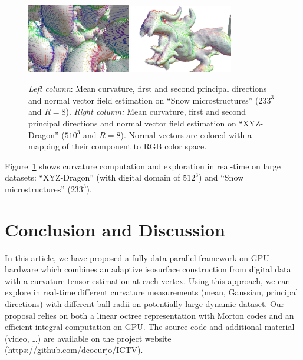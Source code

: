 \documentclass{llncs}
\begin{document}
\begin{figure}[h!]
\begin{center}
     {\includegraphics[width=0.4\textwidth]{figs/snow_r8_normales}}
     {\includegraphics[width=0.4\textwidth]{figs/dragon_r8_normales}}

   \end{center}
   \caption{\emph{Left column}: Mean curvature, first and second
     principal directions and normal vector field estimation on ``Snow microstructures'' ($233^3$ and $R=8$).
  \emph{Right column:} Mean curvature, first and second principal
  directions and normal vector field estimation on ``XYZ-Dragon'' ($510^3$
  and $R=8$). Normal vectors are colored with a mapping of their
  component to RGB color space.}
   \label{fig:adaptive}
   \vspace{-0.35cm}
 \end{figure}

 Figure~\ref{fig:adaptive} shows curvature computation and exploration in
 real-time on large datasets: ``XYZ-Dragon'' (with digital domain of $512^3$) and
 ``Snow microstructures'' ($233^3$).

\section{Conclusion and Discussion}
\label{sec:discussion}

In this article, we have proposed a fully data parallel framework on GPU
hardware which combines an adaptive isosurface construction from
digital data with a curvature tensor estimation at each vertex. Using
this approach, we can explore in real-time different curvature
measurements (mean, Gaussian, principal directions) with different
ball radii on potentially large dynamic dataset. Our proposal relies
on both a linear octree representation with Morton codes and an
efficient integral computation on GPU. The source code and additional
material (video, \ldots) are available on the project website
(\url{https://github.com/dcoeurjo/ICTV}).
\end{document}

